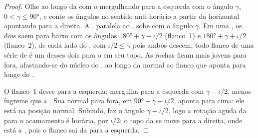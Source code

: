 \begin{proof}
Olhe ao longo da  com o  mergulhando para a esquerda com o ângulo $\gamma$, $0 < \gamma \le \ang{90}$, e conte os ângulos no sentido anti-horário a partir da horizontal apontando para a direita. A , paralela ao , sobe com o ângulo $\gamma$. Em uma  , os dois  saem para baixo com os ângulos $\ang{180} + \gamma - \iota/2$ (flanco~1) e $\ang{180} + \gamma + \iota/2$ (flanco~2), de cada lado do , com $\iota/2 \le \gamma$ pois ambos descem; todo flanco de uma série de  é um desses dois para o  em seu topo. As rochas ficam mais jovens para fora, afastando-se do núcleo do , ao longo da normal ao flanco que aponta para longe do .

O flanco~1 desce para a esquerda: mergulha para a esquerda com $\gamma - \iota/2$, menos íngreme que a . Sua normal para fora, em $\ang{90} + \gamma -
\iota/2$, aponta para cima: ele está na posição normal. Subindo, faz o ângulo $\gamma - \iota/2$, logo a rotação aguda da  para o acamamento é horária, por $\iota/2$: o topo da  se move para a direita, onde está a , pois o flanco sai da  para a esquerda.


\end{proof}
